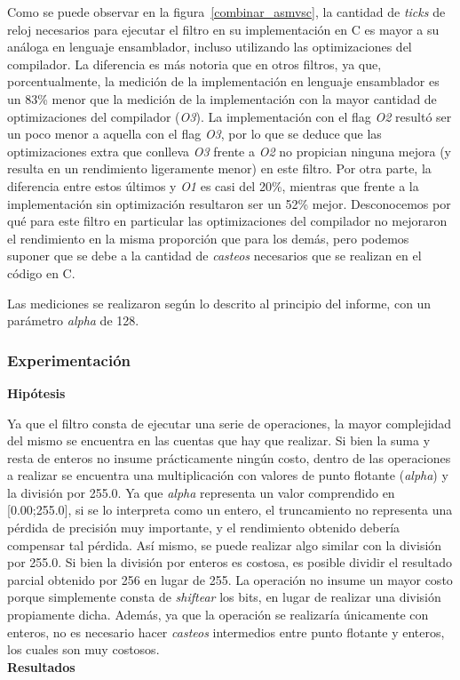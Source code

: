 \documentclass[a4paper]{article}
\begin{document}
Como se puede observar en la figura~\ref{combinar_asmvsc}, la cantidad de \textit{ticks} de reloj necesarios para ejecutar el filtro en su implementación en C es mayor a su análoga en lenguaje ensamblador, incluso utilizando las optimizaciones del compilador. La diferencia es más notoria que en otros filtros, ya que, porcentualmente, la medición de la implementación en lenguaje ensamblador es un 83\% menor que la medición de la implementación con la mayor cantidad de optimizaciones del compilador (\textit{O3}). La implementación con el flag \textit{O2} resultó ser un poco menor a aquella con el flag \textit{O3}, por lo que se deduce que las optimizaciones extra que conlleva \textit{O3} frente a \textit{O2} no propician ninguna mejora (y resulta en un rendimiento ligeramente menor) en este filtro. Por otra parte, la diferencia entre estos últimos y \textit{O1} es casi del 20\%, mientras que frente a la implementación sin optimización resultaron ser un 52\% mejor. Desconocemos por qué para este filtro en particular las optimizaciones del compilador no mejoraron el rendimiento en la misma proporción que para los demás, pero podemos suponer que se debe a la cantidad de \textit{casteos} necesarios que se realizan en el código en C.

Las mediciones se realizaron según lo descrito al principio del informe, con un parámetro \textit{alpha} de 128.
\subsubsection{Experimentación}
\textbf{Hipótesis}

Ya que el filtro consta de ejecutar una serie de operaciones, la mayor complejidad del mismo se encuentra en las cuentas que hay que realizar. Si bien la suma y resta de enteros no insume prácticamente ningún costo, dentro de las operaciones a realizar se encuentra una multiplicación con valores de punto flotante (\textit{alpha}) y la división por 255.0. Ya que \textit{alpha} representa un valor comprendido en [0.00;255.0], si se lo interpreta como un entero, el truncamiento no representa una pérdida de precisión muy importante, y el rendimiento obtenido debería compensar tal pérdida. Así mismo, se puede realizar algo similar con la división por 255.0. Si bien la división por enteros es costosa, es posible dividir el resultado parcial obtenido por 256 en lugar de 255. La operación no insume un mayor costo porque simplemente consta de \textit{shiftear} los bits, en lugar de realizar una división propiamente dicha. Además, ya que la operación se realizaría únicamente con enteros, no es necesario hacer \textit{casteos} intermedios entre punto flotante y enteros, los cuales son muy costosos.
\newline
\\
\textbf{Resultados}
\end{document}
